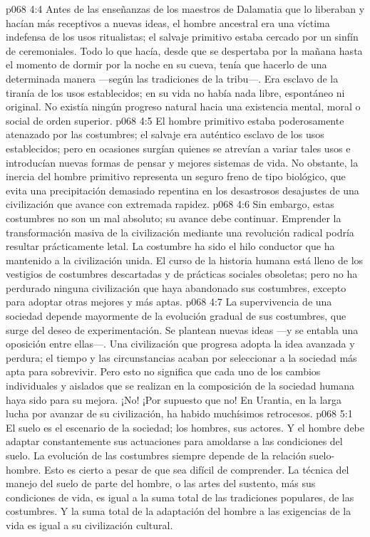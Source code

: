 \vs p068 4:4 Antes de las enseñanzas de los maestros de Dalamatia que lo liberaban y hacían más receptivos a nuevas ideas, el hombre ancestral era una víctima indefensa de los usos ritualistas; el salvaje primitivo estaba cercado por un sinfín de ceremoniales. Todo lo que hacía, desde que se despertaba por la mañana hasta el momento de dormir por la noche en su cueva, tenía que hacerlo de una determinada manera ---según las tradiciones de la tribu---. Era esclavo de la tiranía de los usos establecidos; en su vida no había nada libre, espontáneo ni original. No existía ningún progreso natural hacia una existencia mental, moral o social de orden superior.
\vs p068 4:5 El hombre primitivo estaba poderosamente atenazado por las costumbres; el salvaje era auténtico esclavo de los usos establecidos; pero en ocasiones surgían quienes se atrevían a variar tales usos e introducían nuevas formas de pensar y mejores sistemas de vida. No obstante, la inercia del hombre primitivo representa un seguro freno de tipo biológico, que evita una precipitación demasiado repentina en los desastrosos desajustes de una civilización que avance con extremada rapidez.
\vs p068 4:6 Sin embargo, estas costumbres no son un mal absoluto; su avance debe continuar. Emprender la transformación masiva de la civilización mediante una revolución radical podría resultar prácticamente letal. La costumbre ha sido el hilo conductor que ha mantenido a la civilización unida. El curso de la historia humana está lleno de los vestigios de costumbres descartadas y de prácticas sociales obsoletas; pero no ha perdurado ninguna civilización que haya abandonado sus costumbres, excepto para adoptar otras mejores y más aptas.
\vs p068 4:7 La supervivencia de una sociedad depende mayormente de la evolución gradual de sus costumbres, que surge del deseo de experimentación. Se plantean nuevas ideas ---y se entabla una oposición entre ellas---. Una civilización que progresa adopta la idea avanzada y perdura; el tiempo y las circunstancias acaban por seleccionar a la sociedad más apta para sobrevivir. Pero esto no significa que cada uno de los cambios individuales y aislados que se realizan en la composición de la sociedad humana haya sido para su mejora. ¡No! ¡Por supuesto que no! En Urantia, en la larga lucha por avanzar de su civilización, ha habido muchísimos retrocesos.
\vs p068 5:1 El suelo es el escenario de la sociedad; los hombres, sus actores. Y el hombre debe adaptar constantemente sus actuaciones para amoldarse a las condiciones del suelo. La evolución de las costumbres siempre depende de la relación suelo\hyp{}hombre. Esto es cierto a pesar de que sea difícil de comprender. La técnica del manejo del suelo de parte del hombre, o las artes del sustento, más sus condiciones de vida, es igual a la suma total de las tradiciones populares, de las costumbres. Y la suma total de la adaptación del hombre a las exigencias de la vida es igual a su civilización cultural.
